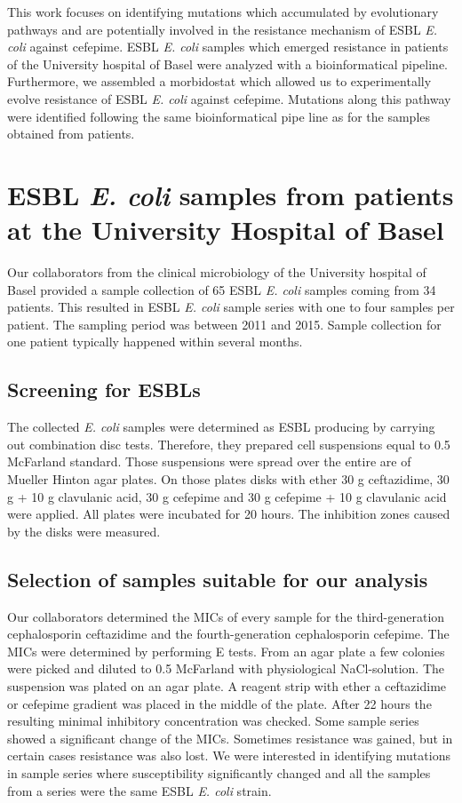 This work focuses on identifying mutations which accumulated by evolutionary pathways and are potentially involved in the resistance mechanism of ESBL \textit{E. coli} against cefepime. ESBL \textit{E. coli} samples which emerged resistance in patients of the University hospital of Basel were analyzed with a bioinformatical pipeline. Furthermore, we assembled a morbidostat which allowed us to experimentally evolve resistance of ESBL \textit{E. coli} against cefepime. Mutations along this pathway were identified following the same bioinformatical pipe line as for the samples obtained from patients.

\section{ESBL \textit{E. coli} samples from patients at the University Hospital of Basel}
Our collaborators from the clinical microbiology of the University hospital of Basel provided a sample collection of 65 ESBL \textit{E. coli} samples coming from 34 patients. This resulted in ESBL \textit{E. coli} sample series with one to four samples per patient. The sampling period was between 2011 and 2015. Sample collection for one patient typically happened within several months.
\label{section:sample_collection}

\subsection{Screening for ESBLs}
The collected \textit{E. coli} samples were determined as ESBL producing by carrying out combination disc tests. Therefore, they prepared cell suspensions equal to 0.5 McFarland standard. Those suspensions were spread over the entire are of Mueller Hinton agar plates. On those plates disks with ether 30 \textmu g ceftazidime, 30 \textmu g + 10 \textmu g clavulanic acid, 30 \textmu g cefepime and 30 \textmu g cefepime + 10 \textmu g clavulanic acid were applied. All plates were incubated for 20 hours. The inhibition zones caused by the disks were measured. 

\subsection{Selection of samples suitable for our analysis}
Our collaborators determined the MICs of every sample for the third-generation cephalosporin ceftazidime and the fourth-generation cephalosporin cefepime. The MICs were determined by performing E tests. From an agar plate a few colonies were picked and diluted to 0.5 McFarland with physiological NaCl-solution. The suspension was plated on an agar plate. A reagent strip with ether a ceftazidime or cefepime gradient was placed in the middle of the plate. After 22 hours the resulting minimal inhibitory concentration was checked. 
Some sample series showed a significant change of the MICs. Sometimes resistance was gained, but in certain cases resistance was also lost. We were interested in identifying mutations in sample series where susceptibility significantly changed and all the samples from a series were the same ESBL \textit{E. coli} strain.
\label{section:samples}

